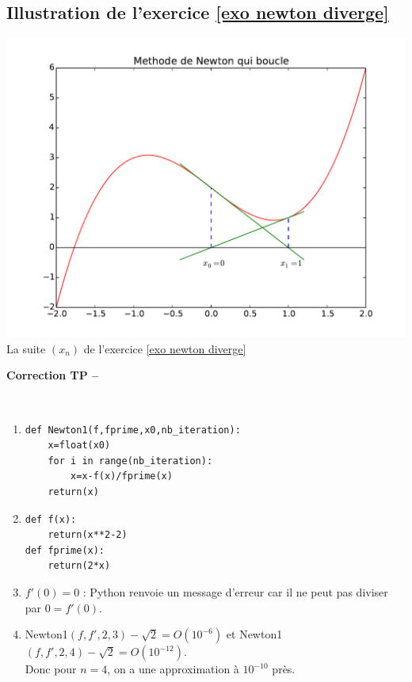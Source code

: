 \subsection{Illustration de l'exercice  \ref{exo newton diverge}}
\begin{center}
\includegraphics[scale=0.5]{Dessin/Newton_boucle.pdf}\\
La suite $(x_n)$ de l'exercice \ref{exo newton diverge}
\end{center}





\ifdef{\public}{}{}

\newpage 

\begin{center}
{\Large\bf Correction TP \no {\num} -- \descrip}
\end{center}


\begin{solution}~\\
\vspace*{-0.7cm}
\begin{enumerate}
\item \begin{verbatim}
def Newton1(f,fprime,x0,nb_iteration):
    x=float(x0)
    for i in range(nb_iteration):
        x=x-f(x)/fprime(x)
    return(x) 
\end{verbatim}
\item \begin{verbatim}
def f(x):
    return(x**2-2)
def fprime(x):
    return(2*x)
\end{verbatim}
\item $f'(0)=0$ : Python renvoie un message d'erreur car il ne peut pas diviser par $0=f'(0)$.
\item Newton1$(f,f',2,3)-\sqrt{2}=O( 10^{-6})$ et Newton1$(f,f',2,4)-\sqrt{2}=O( 10^{-12})$.\\
Donc pour $n=4$, on a une approximation \` a $10^{-10}$ pr\` es.
\end{enumerate}
\end{solution}

